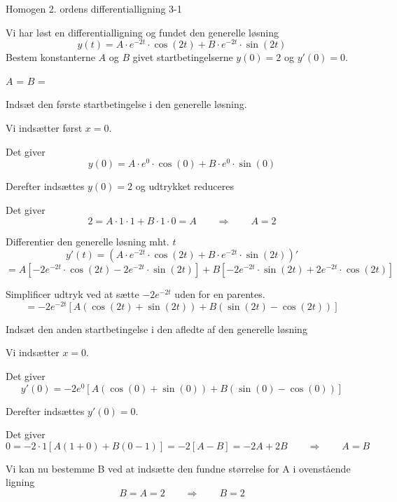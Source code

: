 \documentclass{article}
\begin{document}
\begin{exercise}{Homogen 2. ordens differentialligning 3-1}

Vi har løst en differentialligning og fundet den generelle løsning
\[
y(t) = A \cdot e^{-2 t} \cdot \cos(2 t)+ B \cdot e^{-2 t} \cdot \sin(2 t)
\]
Bestem konstanterne $A$ og $B$ givet startbetingelserne $y(0)=2$ og $y'(0)=0$.


$A$ = 
$B$ = 

\hint

Indsæt den første startbetingelse i den generelle løsning.


\hint

Vi indsætter først $x=0$.

\hint

Det giver
\[
y(0)= A \cdot e^{0} \cdot \cos(0)+ B \cdot e^{0} \cdot \sin(0)
\]

\hint

Derefter indsættes $y(0)=2$ og udtrykket reduceres

\hint

Det giver
\[
2= A \cdot 1 \cdot 1+ B \cdot 1 \cdot 0 = A \qquad \Rightarrow \qquad A = 2
\]

\hint

Differentier den generelle løsning mht. $t$
\[
y'(t) = \left(A \cdot e^{-2 t} \cdot \cos(2 t)+ B \cdot e^{-2 t} \cdot \sin(2 t)\right)'
\]
\[
= A \left[-2 e^{-2t} \cdot \cos(2t) - 2e^{-2t} \cdot \sin(2t) \right] + B \left[ -2 e^{-2t} \cdot \sin(2t) + 2e^{-2t} \cdot \cos(2t) \right]
\]

\hint

Simplificer udtryk ved at sætte $ -2 e^{-2t}$ uden for en parentes.
\[
= - 2 e^{-2t} \left[ A (\cos(2t) + \sin(2t)) + B (\sin(2t) - \cos(2t)) \right]
\]

\hint

Indsæt den anden startbetingelse i den afledte af den generelle løsning

\hint

Vi indsætter $x=0$.

\hint

Det giver
\[
y'(0) = - 2 e^{0} \left[ A (\cos(0) + \sin(0)) + B (\sin(0) - \cos(0)) \right]
\]

\hint

Derefter indsættes $y'(0)=0$.
\hint

Det giver
\[
0 = - 2 \cdot 1 \left[ A (1 + 0) + B (0 - 1) \right] = - 2\left[ A -B \right] = -2 A + 2B \qquad \Rightarrow \qquad A = B
\]

\hint

Vi kan nu bestemme B ved at indsætte den fundne størrelse for A i ovenstående ligning
\[
B = A = 2 \qquad \Rightarrow \qquad B = 2
\]


\end{exercise}
\end{document}
